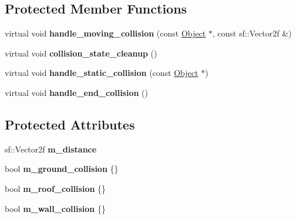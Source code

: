 \subsection*{Protected Member Functions}
\begin{DoxyCompactItemize}
\item 
\hypertarget{classMovable__Object_a909989f83255795f755742be6db62713}{virtual void {\bfseries handle\+\_\+moving\+\_\+collision} (const \hyperlink{classObject}{Object} $\ast$, const sf\+::\+Vector2f \&)}\label{classMovable__Object_a909989f83255795f755742be6db62713}

\item 
\hypertarget{classMovable__Object_a7091c50aa4cd1438424737441e9ff72a}{virtual void {\bfseries collision\+\_\+state\+\_\+cleanup} ()}\label{classMovable__Object_a7091c50aa4cd1438424737441e9ff72a}

\item 
\hypertarget{classMovable__Object_a1d92a4bbc7c741bf3d1c65004eab2adb}{virtual void {\bfseries handle\+\_\+static\+\_\+collision} (const \hyperlink{classObject}{Object} $\ast$)}\label{classMovable__Object_a1d92a4bbc7c741bf3d1c65004eab2adb}

\item 
\hypertarget{classMovable__Object_a71916586f5f73c836568503dcd7b0eb7}{virtual void {\bfseries handle\+\_\+end\+\_\+collision} ()}\label{classMovable__Object_a71916586f5f73c836568503dcd7b0eb7}

\end{DoxyCompactItemize}
\subsection*{Protected Attributes}
\begin{DoxyCompactItemize}
\item 
\hypertarget{classMovable__Object_a3824126abcb82e10d65c0427ac291ef4}{sf\+::\+Vector2f {\bfseries m\+\_\+distance}}\label{classMovable__Object_a3824126abcb82e10d65c0427ac291ef4}

\item 
\hypertarget{classMovable__Object_a00d1c3d1f5cb644a9d9de84128de136f}{bool {\bfseries m\+\_\+ground\+\_\+collision} \{\}}\label{classMovable__Object_a00d1c3d1f5cb644a9d9de84128de136f}

\item 
\hypertarget{classMovable__Object_aa491f8684b9fa3d4d81047de1ad644ee}{bool {\bfseries m\+\_\+roof\+\_\+collision} \{\}}\label{classMovable__Object_aa491f8684b9fa3d4d81047de1ad644ee}

\item 
\hypertarget{classMovable__Object_aacdedf600c68dbfaa756484c39ae9229}{bool {\bfseries m\+\_\+wall\+\_\+collision} \{\}}\label{classMovable__Object_aacdedf600c68dbfaa756484c39ae9229}

\end{DoxyCompactItemize}


